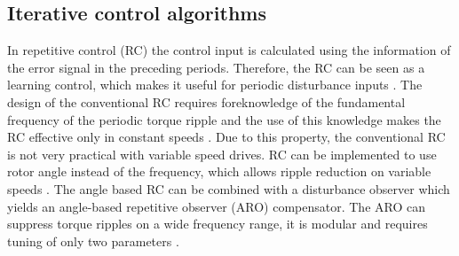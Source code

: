 \subsection{Iterative control algorithms}
In repetitive control (RC) the control input is calculated using the information of the error signal in the preceding periods. Therefore, the RC can be seen as a learning control, which makes it useful for periodic disturbance inputs \cite{RC:1988}. The design of the conventional RC requires foreknowledge of the fundamental frequency of the periodic torque ripple and the use of this knowledge makes the RC effective only in constant speeds \cite{RC:2017}. Due to this property, the conventional RC is not very practical with variable speed drives. RC can be implemented to use rotor angle instead of the frequency, which allows ripple reduction on variable speeds \cite{RC:2017}. The angle based RC can be combined with a disturbance observer which yields an angle-based repetitive observer (ARO) compensator. The ARO can suppress torque ripples on a wide frequency range, it is modular and requires tuning of only two parameters \cite{TRR_SW:2019}.

